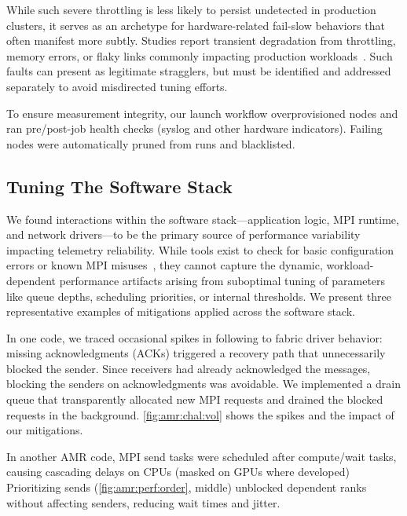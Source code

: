 While such severe throttling is less likely to persist undetected in production clusters, it serves
as an archetype for hardware-related fail-slow behaviors that often manifest more subtly.
Studies report transient degradation from throttling, memory errors, or flaky links commonly
impacting production workloads~\cite{Gunaw2018:FailSlow,Lu2023:PERSEUS}.
Such faults can present as legitimate stragglers, but must be identified and addressed separately
to avoid misdirected tuning efforts.

To ensure measurement integrity, our launch workflow overprovisioned nodes and ran pre/post-job
health checks (syslog and other hardware indicators).
Failing nodes were automatically pruned from runs and blacklisted.

\subsection{Tuning The Software Stack}\label{sec:amr:tele:sw}
\figtunesw

We found interactions within the software stack---application logic, MPI runtime, and network
drivers---to be the primary source of performance variability impacting telemetry reliability.
While tools exist to check for basic configuration errors or known MPI
misuses~\cite{Hilbr2010:MUST}, they cannot capture the dynamic, workload-dependent performance
artifacts arising from suboptimal tuning of parameters like queue depths, scheduling priorities, or
internal thresholds.
We present three representative examples of mitigations applied across the software stack.

 In one code, we traced occasional spikes in \mpiw{} following \mpiis{} to fabric driver
behavior: missing acknowledgments (ACKs) triggered a recovery path that unnecessarily blocked the
sender.
Since receivers had already acknowledged the messages, blocking the senders on acknowledgments was
avoidable.
We implemented a drain queue that transparently allocated new MPI requests and drained the blocked
requests in the background.
\cref{fig:amr:chal:vol} shows the spikes and the impact of our mitigations.

In another AMR code, MPI send tasks were scheduled after compute/wait tasks, causing cascading
delays on CPUs (masked on GPUs where developed) Prioritizing sends (\cref{fig:amr:perf:order}, middle)
unblocked dependent ranks without affecting senders, reducing wait times and jitter.

